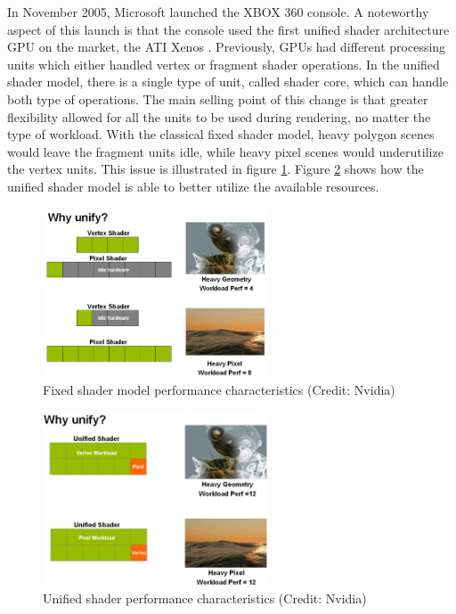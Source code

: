 In November 2005, Microsoft launched the XBOX 360 console. A noteworthy aspect of this launch is that the console used the first unified shader architecture GPU on the market, the ATI Xenos \cite{xbox_360_specs}. Previously, GPUs had different processing units which either handled vertex or fragment shader operations. In the unified shader model, there is a single type of unit, called shader core, which can handle both type of operations. The main selling point of this change is that greater flexibility allowed for all the units to be used during rendering, no matter the type of workload. With the classical fixed shader model, heavy polygon scenes would leave the fragment units idle, while heavy pixel scenes would underutilize the vertex units. This issue is illustrated in figure \ref{fig:gpu-fixed-shader-perf}. Figure \ref{fig:gpu-unified-shader-perf} shows how the unified shader model is able to better utilize the available resources.

\begin{figure}[ht]
    \centering
    \includegraphics[width=0.6\textwidth]{img/classic-model-gpu-idle-units.png}
    \captionsetup{justification=centering}
    \caption{Fixed shader model performance characteristics (Credit: Nvidia)}
    \label{fig:gpu-fixed-shader-perf}
\end{figure}

\begin{figure}[ht]
    \centering
    \includegraphics[width=0.6\textwidth]{img/unified-shader-gpu-utilization.png}
    \captionsetup{justification=centering}
    \caption{Unified shader performance characteristics (Credit: Nvidia)}
    \label{fig:gpu-unified-shader-perf}
\end{figure}

